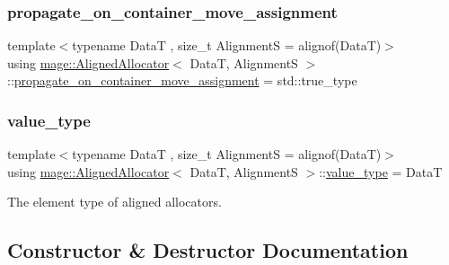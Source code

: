 \hypertarget{classmage_1_1_aligned_allocator_ab0fce958c6e7a2a51861d9179067aa33}{}\label{classmage_1_1_aligned_allocator_ab0fce958c6e7a2a51861d9179067aa33} 
\subsubsection{\texorpdfstring{propagate\+\_\+on\+\_\+container\+\_\+move\+\_\+assignment}{propagate\_on\_container\_move\_assignment}}
{\footnotesize\ttfamily template$<$typename DataT , size\+\_\+t AlignmentS = alignof(\+Data\+T)$>$ \\
using \hyperlink{classmage_1_1_aligned_allocator}{mage\+::\+Aligned\+Allocator}$<$ DataT, AlignmentS $>$\+::\hyperlink{classmage_1_1_aligned_allocator_ab0fce958c6e7a2a51861d9179067aa33}{propagate\+\_\+on\+\_\+container\+\_\+move\+\_\+assignment} =  std\+::true\+\_\+type}

\hypertarget{classmage_1_1_aligned_allocator_a04614928948b5589c241726e3441e058}{}\label{classmage_1_1_aligned_allocator_a04614928948b5589c241726e3441e058} 
\subsubsection{\texorpdfstring{value\+\_\+type}{value\_type}}
{\footnotesize\ttfamily template$<$typename DataT , size\+\_\+t AlignmentS = alignof(\+Data\+T)$>$ \\
using \hyperlink{classmage_1_1_aligned_allocator}{mage\+::\+Aligned\+Allocator}$<$ DataT, AlignmentS $>$\+::\hyperlink{classmage_1_1_aligned_allocator_a04614928948b5589c241726e3441e058}{value\+\_\+type} =  DataT}

The element type of aligned allocators. 

\subsection{Constructor \& Destructor Documentation}
\hypertarget{classmage_1_1_aligned_allocator_a882b621a8276d046f3300385680442cf}{}\label{classmage_1_1_aligned_allocator_a882b621a8276d046f3300385680442cf} 
